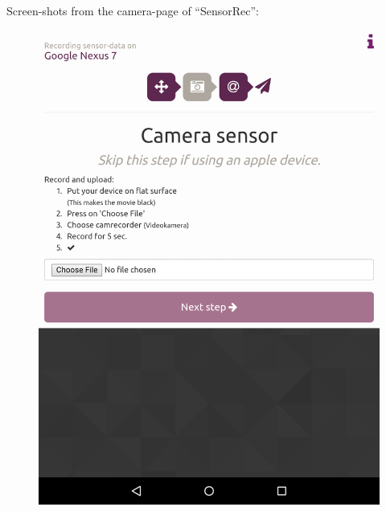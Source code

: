 Screen-shots from the camera-page of ``SensorRec'':
\begin{figure}[h!]
  \hspace{-2cm}
  \centering
  \begin{minipage}[c]{.23\textwidth}
    \centering
    \includegraphics[scale=0.15]{img/sensorrec-nexus-3-cam}
  \end{minipage}
  \hspace{2cm}
  \begin{minipage}[c]{.23\textwidth}
    \centering

\end{minipage}
\end{figure}
